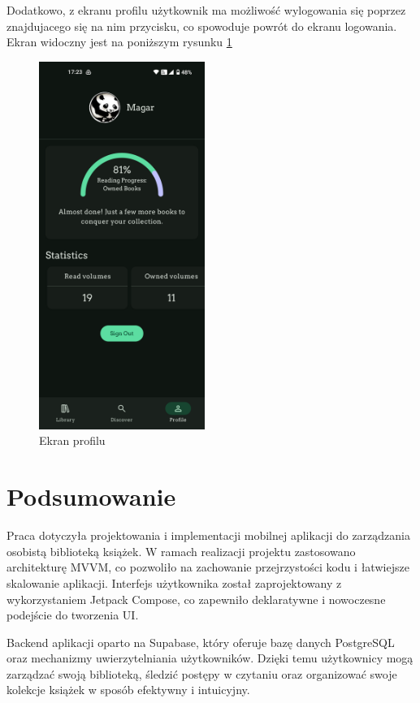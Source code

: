 \documentclass[12pt,twoside]{article}
\begin{document}
Dodatkowo, z ekranu profilu użytkownik ma możliwość wylogowania się poprzez znajdujacego się na nim przycisku, 
co spowoduje powrót do ekranu logowania. Ekran widoczny jest na poniższym rysunku \ref{Fig:profile}
\begin{figure}[ht]
	\centering
	\includegraphics[width=0.48\textwidth]{figures/profile.png}
	\caption{Ekran profilu}
\label{Fig:profile}
\end{figure}

\clearpage

\section{Podsumowanie}
Praca dotyczyła projektowania i implementacji mobilnej aplikacji do zarządzania osobistą biblioteką książek. W 
ramach realizacji projektu zastosowano architekturę MVVM, co pozwoliło na zachowanie przejrzystości kodu i 
łatwiejsze skalowanie aplikacji. Interfejs użytkownika został zaprojektowany z wykorzystaniem Jetpack Compose, 
co zapewniło deklaratywne i nowoczesne podejście do tworzenia UI.

Backend aplikacji oparto na Supabase, który oferuje bazę danych PostgreSQL oraz mechanizmy uwierzytelniania 
użytkowników. Dzięki temu użytkownicy mogą zarządzać swoją biblioteką, śledzić postępy w czytaniu oraz 
organizować swoje kolekcje książek w sposób efektywny i intuicyjny.
\end{document}
